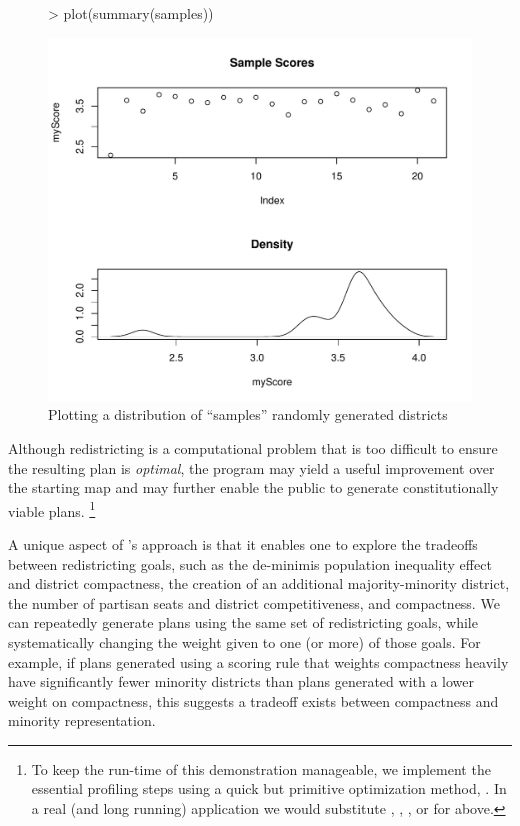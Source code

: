 \documentclass[article]{JSSstyle/jss}
\begin{document}
  \begin{figure}[!h]
\begin{Schunk}
\begin{Sinput}
> plot(summary(samples))
\end{Sinput}
\end{Schunk}
\includegraphics{bardJSS-plot3a}
  \caption{\label{fig:rplot3} Plotting a distribution of ``samples'' randomly generated districts}
  \end{figure}
  
  

Although redistricting is a computational problem that is too difficult to ensure the resulting plan is \emph{optimal}, the program may yield a useful improvement over the starting map and may further enable the public to generate 
constitutionally viable plans. \footnote{To keep the run-time of this demonstration manageable, we implement the essential profiling steps  using a quick but primitive optimization method, .  In a 
real (and long running) application we would substitute , , , or  for  above.}  

A unique aspect of 's approach is that it enables
one to explore the tradeoffs between redistricting goals, such as the
de-minimis population inequality effect and district
compactness, the creation of an additional majority-minority
district, the number of partisan seats and district
competitiveness, and compactness. We can repeatedly
generate plans using the same set of redistricting goals,
while systematically changing the weight given to
one (or more) of those goals. For example, if plans generated
using a scoring rule that weights compactness heavily have
significantly fewer minority districts than plans generated with a
lower weight on compactness, this suggests a tradeoff exists
between compactness and minority representation.
\end{document}
